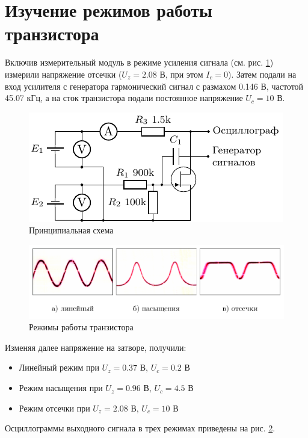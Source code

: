 \documentclass[a4paper,14pt]{extarticle}
\begin{document}
\section{Изучение режимов работы транзистора}

Включив измерительный модуль в режиме усиления сигнала (см. рис. \ref{fig:chem2}) измерили напряжение отсечки ($U_z=2.08$ В, при этом $I_c=0$). Затем подали на вход усилителя с генератора гармонический сигнал с размахом 0.146 В, частотой 45.07 кГц, а на сток транзистора подали постоянное напряжение $U_c=10$ В.


\begin{figure}[H]
	\centering
	\includegraphics[scale=1.75]{fig/chem2}
	\caption{Принципиальная схема}
	\label{fig:chem2}
\end{figure}

\begin{figure}[H]
	\centering
	\includegraphics[width=\textwidth]{fig/osci}
	\vspace{-2em}
	\caption{Режимы работы транзистора}
	\label{fig:osci}
\end{figure}

Изменяя далее напряжение на затворе, получили:
\begin{itemize}
	\item Линейный режим при $U_z=0.37$ В, $U_c=0.2$ В
	\item Режим насыщения при $U_z=0.96$ В, $U_c=4.5$ В
	\item Режим отсечки при $U_z=2.08$ В, $U_c=10$ В
\end{itemize}
Осциллограммы выходного сигнала в трех режимах приведены на рис. \ref{fig:osci}.
\end{document}
